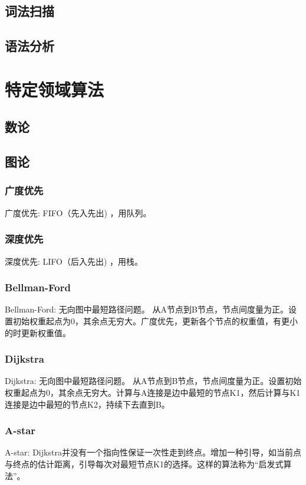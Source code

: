 \documentclass[UTF8]{../computerUniverse}
\begin{document}
\section{词法扫描}
\section{语法分析}



\chapter{特定领域算法}

\section{数论}


\section{图论}

\subsection{广度优先}
广度优先: FIFO（先入先出) ，用队列。


\subsection{深度优先}
深度优先: LIFO（后入先出) ，用栈。


\subsection{Bellman-Ford}
Bellman-Ford: 无向图中最短路径问题。
从A节点到B节点，节点间度量为正。设置初始权重起点为0，其余点无穷大。广度优先，更新各个节点的权重值，有更小的时更新权重值。


\subsection{Dijkstra}
Dijkstra: 无向图中最短路径问题。
从A节点到B节点，节点间度量为正。设置初始权重起点为0，其余点无穷大。计算与A连接是边中最短的节点K1，然后计算与K1连接是边中最短的节点K2，持续下去直到B。


\subsection{A-star}
A-star: Dijkstra并没有一个指向性保证一次性走到终点。增加一种引导，如当前点与终点的估计距离，引导每次对最短节点K1的选择。这样的算法称为“启发式算法”。
\end{document}
